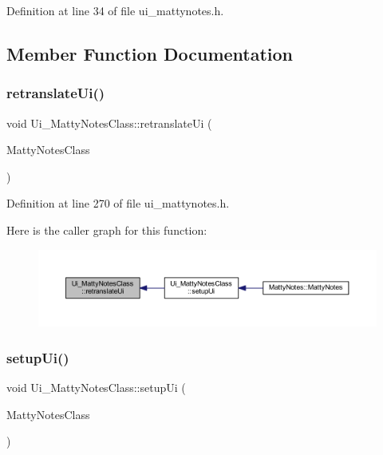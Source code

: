 Definition at line 34 of file ui\+\_\+mattynotes.\+h.



\subsection{Member Function Documentation}
\hypertarget{classUi__MattyNotesClass_a3a5915db60e9488bd96bf4ea0c844422}{}\label{classUi__MattyNotesClass_a3a5915db60e9488bd96bf4ea0c844422} 
\subsubsection{\texorpdfstring{retranslate\+Ui()}{retranslateUi()}}
{\footnotesize\ttfamily void Ui\+\_\+\+Matty\+Notes\+Class\+::retranslate\+Ui (\begin{DoxyParamCaption}\item[{Q\+Main\+Window $\ast$}]{Matty\+Notes\+Class }\end{DoxyParamCaption})\hspace{0.3cm}{\ttfamily [inline]}}



Definition at line 270 of file ui\+\_\+mattynotes.\+h.

Here is the caller graph for this function\+:
\nopagebreak
\begin{figure}[H]
\begin{center}
\leavevmode
\includegraphics[width=350pt]{classUi__MattyNotesClass_a3a5915db60e9488bd96bf4ea0c844422_icgraph}
\end{center}
\end{figure}
\hypertarget{classUi__MattyNotesClass_a33a88ea08595a64d445a104fcdfb4e7c}{}\label{classUi__MattyNotesClass_a33a88ea08595a64d445a104fcdfb4e7c} 
\subsubsection{\texorpdfstring{setup\+Ui()}{setupUi()}}
{\footnotesize\ttfamily void Ui\+\_\+\+Matty\+Notes\+Class\+::setup\+Ui (\begin{DoxyParamCaption}\item[{Q\+Main\+Window $\ast$}]{Matty\+Notes\+Class }\end{DoxyParamCaption})\hspace{0.3cm}{\ttfamily [inline]}}



